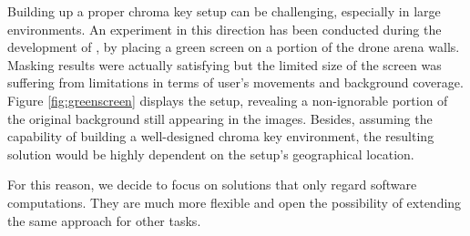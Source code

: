 Building up a proper chroma key setup can be challenging, especially in large environments. An experiment in this direction has been conducted during the development of \cite{mantegazza2019visionbased}, by placing a green screen on a portion of the drone arena walls. Masking results were actually satisfying but the limited size of the screen was suffering from limitations in terms of user's movements and background coverage. Figure \ref{fig:greenscreen} displays the setup, revealing a non-ignorable portion of the original background still appearing in the images. Besides, assuming the capability of building a well-designed chroma key environment, the resulting solution would be highly dependent on the setup's geographical location.

For this reason, we decide to focus on solutions that only regard software computations. They are much more flexible and open the possibility of extending the same approach for other tasks.

